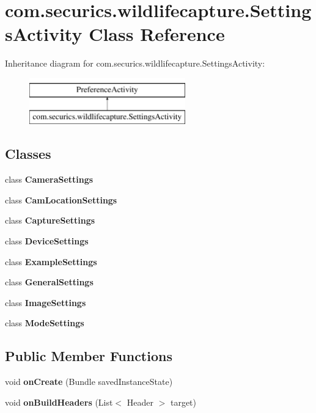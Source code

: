 \section{com.\+securics.\+wildlifecapture.\+Settings\+Activity Class Reference}
\label{classcom_1_1securics_1_1wildlifecapture_1_1_settings_activity}
Inheritance diagram for com.\+securics.\+wildlifecapture.\+Settings\+Activity\+:\begin{figure}[H]
\begin{center}
\leavevmode
\includegraphics[height=2.000000cm]{classcom_1_1securics_1_1wildlifecapture_1_1_settings_activity}
\end{center}
\end{figure}
\subsection*{Classes}
\begin{DoxyCompactItemize}
\item 
class {\bfseries Camera\+Settings}
\item 
class {\bfseries Cam\+Location\+Settings}
\item 
class {\bfseries Capture\+Settings}
\item 
class {\bfseries Device\+Settings}
\item 
class {\bfseries Example\+Settings}
\item 
class {\bfseries General\+Settings}
\item 
class {\bfseries Image\+Settings}
\item 
class {\bfseries Mode\+Settings}
\end{DoxyCompactItemize}
\subsection*{Public Member Functions}
\begin{DoxyCompactItemize}
\item 
void {\bf on\+Create} (Bundle saved\+Instance\+State)
\item 
void {\bf on\+Build\+Headers} (List$<$ Header $>$ target)
\end{DoxyCompactItemize}


